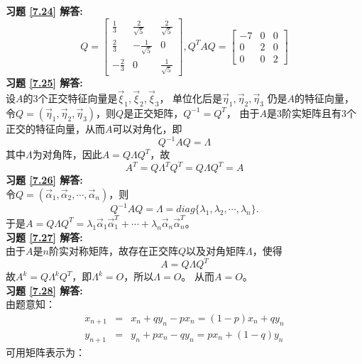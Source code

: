\textbf{习题 \ref{7.24} 解答:}\\
\begin{equation*}
  Q=\begin{bmatrix}\frac{1}{3}&\frac{2}{\sqrt{5}}&\frac{2}{\sqrt{5}}
       \\ \frac{2}{3}&-\frac{1}{\sqrt{5}}&0\\-\frac{2}{3}&0&\frac{1}{\sqrt{5}}\end{bmatrix},
  Q^TAQ=\begin{bmatrix}-7&0&0\\0&2&0\\0&0&2\end{bmatrix}
\end{equation*}
\textbf{习题 \ref{7.25} 解答:}\\
设$A$的3个正交特征向量是$\vec{\xi}_1,\vec{\xi}_2,\vec{\xi}_3$，
单位化后是$\vec{\eta}_1,\vec{\eta}_2,\vec{\eta}_3$ 仍是$A$的特征向量，
令$Q=(\vec{\eta}_1,\vec{\eta}_2,\vec{\eta}_3)$，则$Q$是正交矩阵，$Q^{-1}=Q^T$，
由于$A$是3阶实矩阵且有3个正交的特征向量，从而$A$可以对角化，即
\begin{equation*}
  Q^{-1}AQ=\Lambda
\end{equation*}
其中$\Lambda$为对角阵，因此$A=Q\Lambda Q^T$，故
\begin{equation*}
  A^T=Q\Lambda^TQ^T=Q\Lambda Q^T=A
\end{equation*}
\textbf{习题 \ref{7.26} 解答:}\\
令$Q=(\vec{\alpha}_1,\vec{\alpha}_2,\cdots,\vec{\alpha}_n)$，则
\begin{equation*}
  Q^{-1}AQ=\Lambda=diag\{\lambda_1,\lambda_2,\cdots,\lambda_n\}.
\end{equation*}
于是$A=Q\Lambda Q^T=\lambda_1\vec{\alpha}_1\vec{\alpha}_1^T+\cdots+\lambda_n\vec{\alpha}_n\vec{\alpha}_n^T$。\\
\textbf{习题 \ref{7.27} 解答:}\\
由于$A$是$n$阶实对称矩阵，故存在正交阵$Q$以及对角矩阵$\Lambda$，使得
\begin{equation*}
  A=Q\Lambda Q^T
\end{equation*}
故$A^{k}=Q\Lambda^kQ^T$，即$\Lambda^k=O$，所以$\Lambda=O$。 从而$A=O$。\\
\textbf{习题 \ref{7.28} 解答:}\\
由题意知：
\begin{eqnarray*}
  x_{n+1} &=& x_n+qy_n-px_n=(1-p)x_n+qy_n \\
  y_{n+1} &=& y_n+px_n-qy_n=px_n+(1-q)y_n
\end{eqnarray*}
可用矩阵表示为：
